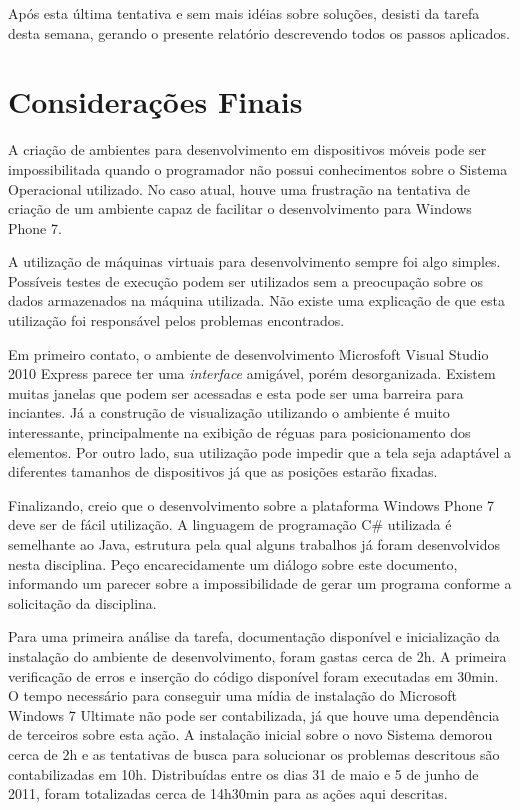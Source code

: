 \documentclass{article}
\begin{document}
Após esta última tentativa e sem mais idéias sobre soluções, desisti da tarefa
desta semana, gerando o presente relatório descrevendo todos os passos
aplicados.

\section{Considerações Finais}
\label{sec:consideracoes}

A criação de ambientes para desenvolvimento em dispositivos móveis pode ser
impossibilitada quando o programador não possui conhecimentos sobre o Sistema
Operacional utilizado. No caso atual, houve uma frustração na tentativa de
criação de um ambiente capaz de facilitar o desenvolvimento para Windows Phone
7.

A utilização de máquinas virtuais para desenvolvimento sempre foi algo simples.
Possíveis testes de execução podem ser utilizados sem a preocupação sobre os
dados armazenados na máquina utilizada. Não existe uma explicação de que esta
utilização foi responsável pelos problemas encontrados.

Em primeiro contato, o ambiente de desenvolvimento Microsfoft Visual Studio 2010
Express parece ter uma \textit{interface} amigável, porém desorganizada. Existem
muitas janelas que podem ser acessadas e esta pode ser uma barreira para
inciantes. Já a construção de visualização utilizando o ambiente é muito
interessante, principalmente na exibição de réguas para posicionamento dos
elementos. Por outro lado, sua utilização pode impedir que a tela seja adaptável
a diferentes tamanhos de dispositivos já que as posições estarão fixadas.

Finalizando, creio que o desenvolvimento sobre a plataforma Windows Phone 7 deve
ser de fácil utilização. A linguagem de programação C\# utilizada é semelhante
ao Java, estrutura pela qual alguns trabalhos já foram desenvolvidos nesta
disciplina. Peço encarecidamente um diálogo sobre este documento, informando um
parecer sobre a impossibilidade de gerar um programa conforme a solicitação da
disciplina.

Para uma primeira análise da tarefa, documentação disponível e inicialização da
instalação do ambiente de desenvolvimento, foram gastas cerca de 2h. A primeira
verificação de erros e inserção do código disponível foram executadas em 30min.
O tempo necessário para conseguir uma mídia de instalação do Microsoft Windows 7
Ultimate não pode ser contabilizada, já que houve uma dependência de terceiros
sobre esta ação. A instalação inicial sobre o novo Sistema demorou cerca de 2h e
as tentativas de busca para solucionar os problemas descritous são
contabilizadas em 10h. Distribuídas entre os dias 31 de maio e 5 de junho de
2011, foram totalizadas cerca de 14h30min para as ações aqui descritas.
\end{document}
